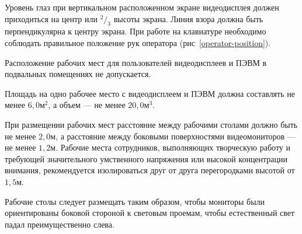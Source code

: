 Уровень глаз при вертикальном расположенном экране видеодисплея должен приходиться на центр или \(^2/_3\) высоты экрана. Линия взора должна быть перпендикулярна к центру экрана. При работе на клавиатуре необходимо соблюдать правильное положение рук оператора (рис~\ref{operator-position}).\cite{mihnuk07}

Расположение рабочих мест для пользователей видеодисплеев и ПЭВМ в подвальных помещениях не допускается.\cite{mihnuk07}

Площадь на одно рабочее место с видеодисплеем и ПЭВМ должна составлять не менее \(6,0 \text{м}^2\), а объем --- не менее \(20,0 \text{м}^3\).\cite{mihnuk07}

При размещении рабочих мест расстояние между рабочими столами должно быть не менее \(2,0 \text{м}\), а расстояние между боковыми поверхностями видеомониторов --- не менее \(1,2 \text{м}\). Рабочие места сотрудников, выполняющих творческую работу и требующей значительного умственного напряжения или высокой концентрации внимания, рекомендуется изолироваться друг от друга перегородками высотой от \(1,5 \text{м}\).\cite{mihnuk07}

Рабочие столы следует размещать таким образом, чтобы мониторы были ориентированы боковой стороной к световым проемам, чтобы естественный свет падал преимущественно слева.
\newpage

